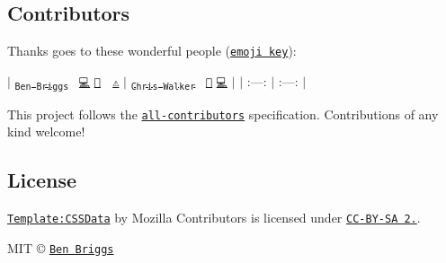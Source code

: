 \subsection*{Contributors}

Thanks goes to these wonderful people (\href{https://github.com/kentcdodds/all-contributors#emoji-key}{\tt emoji key})\+:

$\vert$ \href{http://beneb.info}{\tt \textsubscript{Ben Briggs}}~\newline
\href{https://github.com/ben-eb/postcss-reduce-initial/commits?author=ben-eb}{\tt 💻} \href{https://github.com/ben-eb/postcss-reduce-initial/commits?author=ben-eb}{\tt 📖} 👀 \href{https://github.com/ben-eb/postcss-reduce-initial/commits?author=ben-eb}{\tt ⚠️} $\vert$ \href{http://thechriswalker.github.com/}{\tt \textsubscript{Chris Walker}}~\newline
\href{https://github.com/ben-eb/postcss-reduce-initial/issues?q=author%3Athechriswalker}{\tt 🐛} \href{https://github.com/ben-eb/postcss-reduce-initial/commits?author=thechriswalker}{\tt 💻} $\vert$ $\vert$ \+:---\+: $\vert$ \+:---\+: $\vert$

This project follows the \href{https://github.com/kentcdodds/all-contributors}{\tt all-\/contributors} specification. Contributions of any kind welcome!

\subsection*{License}

\href{https://developer.mozilla.org/en-US/docs/Template:CSSData}{\tt Template\+:C\+S\+S\+Data} by Mozilla Contributors is licensed under \href{http://creativecommons.org/licenses/by-sa/2.5/}{\tt C\+C-\/\+B\+Y-\/\+SA 2.}.

M\+IT © \href{http://beneb.info}{\tt Ben Briggs} 